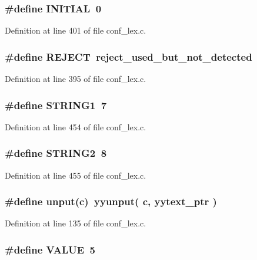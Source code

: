 \subsubsection{\setlength{\rightskip}{0pt plus 5cm}\#define INITIAL\ 0}\label{conf__lex_8c_a36}




Definition at line 401 of file conf\_\-lex.c.
\subsubsection{\setlength{\rightskip}{0pt plus 5cm}\#define REJECT\ reject\_\-used\_\-but\_\-not\_\-detected}\label{conf__lex_8c_a32}




Definition at line 395 of file conf\_\-lex.c.
\subsubsection{\setlength{\rightskip}{0pt plus 5cm}\#define STRING1\ 7}\label{conf__lex_8c_a46}




Definition at line 454 of file conf\_\-lex.c.
\subsubsection{\setlength{\rightskip}{0pt plus 5cm}\#define STRING2\ 8}\label{conf__lex_8c_a47}




Definition at line 455 of file conf\_\-lex.c.
\subsubsection{\setlength{\rightskip}{0pt plus 5cm}\#define unput(c)\ yyunput( c, yytext\_\-ptr )}\label{conf__lex_8c_a18}




Definition at line 135 of file conf\_\-lex.c.
\subsubsection{\setlength{\rightskip}{0pt plus 5cm}\#define VALUE\ 5}\label{conf__lex_8c_a44}




